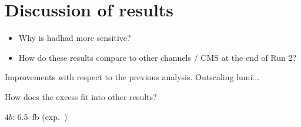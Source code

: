\section{Discussion of results}%
\label{sec:result_discussion}



\begin{itemize}
\item Why is hadhad more sensitive?
\item How do these results compare to other channels / CMS at the end of Run 2?
\end{itemize}

Improvements with respect to the previous analysis. Outscaling lumi...

How does the excess fit into other results?

$4b$: \SI{6.5}{\femto\barn} (exp.\ )


